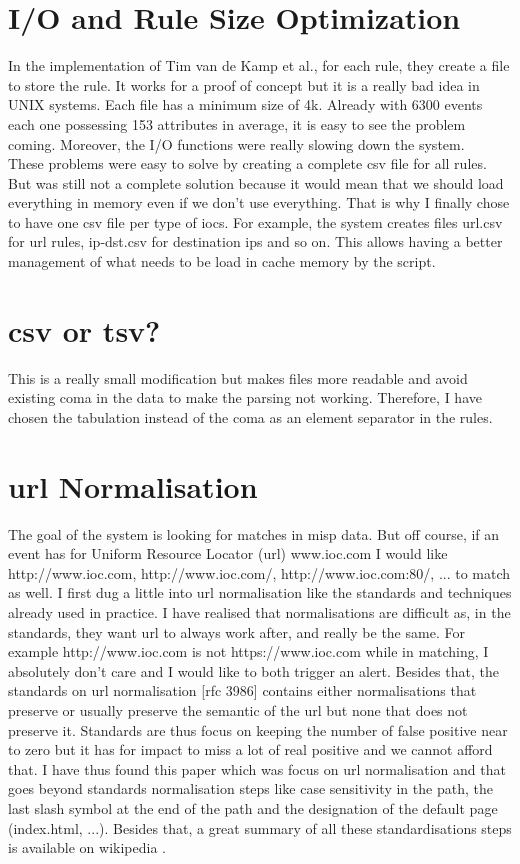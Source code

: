 \documentclass{eplmastersthesis}
\begin{document}
\section{I/O and Rule Size Optimization}
In the implementation of Tim van de Kamp et al., for each rule, they create a file to store the rule. 
It works for a proof of concept but it is a really bad idea in UNIX systems. Each file has a minimum size of 4k. Already with 6300 events each one possessing 153 attributes in average, it is easy to see the problem coming. Moreover, the I/O functions were really slowing down the system.\\

These problems were easy to solve by creating a complete \gls{csv} file for all rules. But was still not a complete solution because it would mean that we should load everything in memory even if we don't use everything. That is why I finally chose to have one \gls{csv} file per type of \glspl{ioc}. For example, the system creates files url.csv for \gls{url} rules, ip-dst.csv for destination \glspl{ip} and so on. This allows having a better management of what needs to be load in cache memory by the script.

\section{\gls{csv} or \gls{tsv}?}
This is a really small modification but makes files more readable and avoid existing coma in the data to make the parsing not working.
Therefore, I have chosen the tabulation instead of the coma as an element separator in the rules.

\section{\gls{url} Normalisation}
The goal of the system is looking for matches in \gls{misp} data. But off course, if an event has for Uniform Resource Locator (\gls{url}) www.ioc.com I would like http://www.ioc.com, http://www.ioc.com/, http://www.ioc.com:80/, ... to match as well.
I first dug a little into \gls{url} normalisation like the standards and techniques already used in practice. I have realised that normalisations are difficult as, in the standards, they want \gls{url} to always work after, and really be the same. For example http://www.ioc.com is not https://www.ioc.com while in matching, I absolutely don't care and I would like to both trigger an alert.
Besides that, the standards on \gls{url} normalisation [\gls{rfc} 3986] contains either normalisations that preserve or usually preserve the semantic of the \gls{url} but none that does not preserve it.
Standards are thus focus on keeping the number of false positive near to zero but it has for impact to miss a lot of real positive and we cannot afford that.
I have thus found this paper \cite{lee2005url} which was focus on \gls{url} normalisation and that goes beyond standards normalisation steps like case sensitivity in the path, the last slash symbol at the end of the path and the designation of the default page (index.html, ...).
Besides that, a great summary of all these standardisations steps is available on wikipedia \cite{wikiNormalizationURL}.\\
\end{document}
